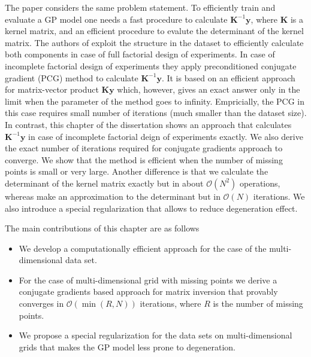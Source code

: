 The paper \citep{wilson2014fast} considers the same problem statement.
To efficiently train and evaluate a GP model one needs a fast procedure
to calculate $\mathbf{K}^{-1}\mathbf{y}$,
where $\mathbf{K}$ is a kernel matrix,
and an efficient procedure to evalute the determinant of the kernel matrix.
The authors of \citep{wilson2014fast} exploit the structure in the dataset
to efficiently calculate both components in case of full factorial design of experiments.
In case of incomplete factorial design of experiments
they apply preconditioned conjugate gradient (PCG) method to calculate $\mathbf{K}^{-1}\mathbf{y}$.
It is based on an efficient approach for matrix-vector product $\mathbf{K}\mathbf{y}$
which, however, gives an exact answer only in the limit when the parameter of the method goes to infinity.
Empricially, the PCG in this case requires small number of iterations (much smaller than the dataset size).
In contrast, this chapter of the dissertation shows an approach that calculates
$\mathbf{K}^{-1}\mathbf{y}$ in case of incomplete factorial deign of experiments exactly.
We also derive the exact number of iterations required for conjugate gradients approach to converge.
We show that the method is efficient when the number of missing points is small or very large.
Another difference is that we calculate the determinant of the kernel matrix exactly but in about
$\mathcal{O}(N^2)$ operations, whereas \citep{wilson2014fast} make an approximation to the determinant
but in $\mathcal{O}(N)$ iterations.
We also introduce a special regularization that allows to reduce degeneration effect.



The main contributions of this chapter are as follows
\begin{itemize}
  \item We develop a computationally efficient approach for the case of the multi-dimensional
  data set.
  \item For the case of multi-dimensional grid with missing points we derive a conjugate gradients
  based approach for matrix inversion that provably converges in $\mathcal{O}(\min (R, N))$
  iterations, where $R$ is the number of missing points.
  \item We propose a special regularization for the data sets on multi-dimensional grids
  that makes the GP model less prone to degeneration.
\end{itemize}


